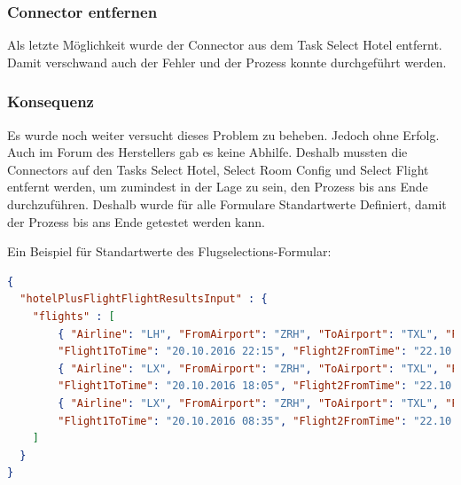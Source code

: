 \subsubsection{Connector entfernen}
\label{sec:umsetzung:problem:removeconnector}
Als letzte Möglichkeit wurde der Connector aus dem Task Select Hotel entfernt. Damit verschwand auch der Fehler und der Prozess konnte durchgeführt werden.

\subsubsection{Konsequenz}
Es wurde noch weiter versucht dieses Problem zu beheben. Jedoch ohne Erfolg. Auch im Forum des Herstellers gab es keine Abhilfe. Deshalb mussten die Connectors auf den Tasks Select Hotel, Select Room Config und Select Flight entfernt werden, um zumindest in der Lage zu sein, den Prozess bis ans Ende durchzuführen. Deshalb wurde für alle Formulare Standartwerte Definiert, damit der Prozess bis ans Ende getestet werden kann.

Ein Beispiel für Standartwerte des Flugselections-Formular:
\begin{lstlisting}[language=json,firstnumber=1]
{
  "hotelPlusFlightFlightResultsInput" : {
    "flights" : [
        { "Airline": "LH", "FromAirport": "ZRH", "ToAirport": "TXL", "Flight1FromTime": "20.10.2016 20:15", 
        "Flight1ToTime": "20.10.2016 22:15", "Flight2FromTime": "22.10.2016 12:25", "Flight2ToTime": "22.10.2016 14:35"},
        { "Airline": "LX", "FromAirport": "ZRH", "ToAirport": "TXL", "Flight1FromTime": "20.10.2016 16:00", 
        "Flight1ToTime": "20.10.2016 18:05", "Flight2FromTime": "22.10.2016 20:45", "Flight2ToTime": "22.10.2016 22:40"},
        { "Airline": "LX", "FromAirport": "ZRH", "ToAirport": "TXL", "Flight1FromTime": "20.10.2016 06:30", 
        "Flight1ToTime": "20.10.2016 08:35", "Flight2FromTime": "22.10.2016 16:00", "Flight2ToTime": "22.10.2016 18:00"}
    ]
  }
}
\end{lstlisting}
